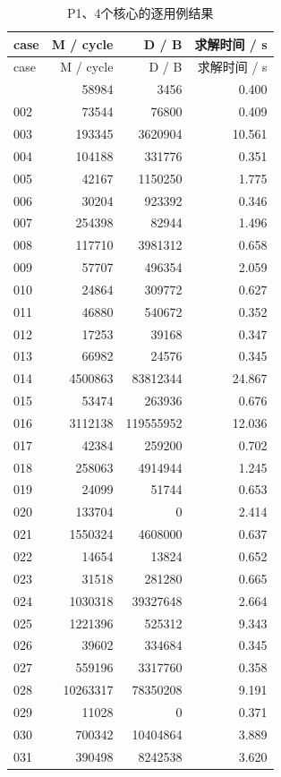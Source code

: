 \documentclass[anonymous,notoc]{gmcm2026}
\begin{document}
\begin{longtable}{lrrr}
\caption{P1、4个核心的逐用例结果}\\
\toprule
case & M / cycle & D / B & 求解时间 / s\\\midrule
\endfirsthead
\toprule
case & M / cycle & D / B & 求解时间 / s\\\midrule
\endhead
\bottomrule\endfoot
001 & 58984 & 3456 & 0.400 \\
002 & 73544 & 76800 & 0.409 \\
003 & 193345 & 3620904 & 10.561 \\
004 & 104188 & 331776 & 0.351 \\
005 & 42167 & 1150250 & 1.775 \\
006 & 30204 & 923392 & 0.346 \\
007 & 254398 & 82944 & 1.496 \\
008 & 117710 & 3981312 & 0.658 \\
009 & 57707 & 496354 & 2.059 \\
010 & 24864 & 309772 & 0.627 \\
011 & 46880 & 540672 & 0.352 \\
012 & 17253 & 39168 & 0.347 \\
013 & 66982 & 24576 & 0.345 \\
014 & 4500863 & 83812344 & 24.867 \\
015 & 53474 & 263936 & 0.676 \\
016 & 3112138 & 119555952 & 12.036 \\
017 & 42384 & 259200 & 0.702 \\
018 & 258063 & 4914944 & 1.245 \\
019 & 24099 & 51744 & 0.653 \\
020 & 133704 & 0 & 2.414 \\
021 & 1550324 & 4608000 & 0.637 \\
022 & 14654 & 13824 & 0.652 \\
023 & 31518 & 281280 & 0.665 \\
024 & 1030318 & 39327648 & 2.664 \\
025 & 1221396 & 525312 & 9.343 \\
026 & 39602 & 334684 & 0.345 \\
027 & 559196 & 3317760 & 0.358 \\
028 & 10263317 & 78350208 & 9.191 \\
029 & 11028 & 0 & 0.371 \\
030 & 700342 & 10404864 & 3.889 \\
031 & 390498 & 8242538 & 3.620 \\

\end{longtable}
\end{document}
